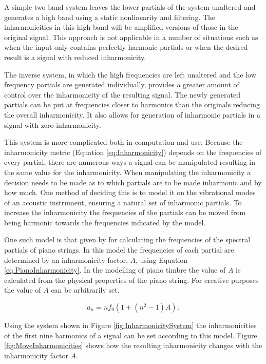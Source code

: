 			A simple two band system leaves the lower partials of the system unaltered and generates a high
			band using a static nonlinearity and filtering. The inharmonicities in this high band will be
			amplified versions of those in the original signal. This approach is not applicable in a number of
			situations such as when the input only contains perfectly harmonic partials or when the desired
			result is a signal with reduced inharmonicity.
			
			The inverse system, in which the high frequencies are left unaltered and the low frequency partials
			are generated individually, provides a greater amount of control over the inharmonicity of the
			resulting signal. The newly generated partials can be put at frequencies closer to harmonics than
			the originals reducing the overall inharmonicity. It also allows for generation of inharmonic
			partials in a signal with zero inharmonicity. 

			This system is more complicated both in computation and use. Because the inharmonicity metric
			(Equation \ref{eq:Inharmonicity}) depends on the frequencies of every partial, there are numerous
			ways a signal can be manipulated resulting in the same value for the inharmonicity. When
			manipulating the inharmonicity a decision needs to be made as to which partials are to be made
			inharmonic and by how much. One method of deciding this is to model it on the vibrational modes of
			an acoustic instrument, ensuring a natural set of inharmonic partials. To increase the
			inharmonicity the frequencies of the partials can be moved from being harmonic towards the
			frequencies indicated by the model.

			One such model is that given by \citet{rossing2002the} for calculating the frequencies of the
			spectral partials of piano strings. In this model the frequencies of each partial are determined by
			an inharmonicity factor, $A$, using Equation \ref{eq:PianoInharmonicity}. In the modelling of piano
			timbre the value of $A$ is calculated from the physical properties of the piano string. For
			creative purposes the value of $A$ can be arbitrarily set.

			\begin{equation}
				a_{n} = nf_{0} \left( 1 + \left( n^{2} - 1 \right) A \right);
				\label{eq:PianoInharmonicity}
			\end{equation}

			Using the system shown in Figure \ref{fig:InharmonicitySystem} the inharmonicities of the first
			nine harmonics of a signal can be set according to this model. Figure \ref{fig:MoveInharmonicities}
			shows how the resulting inharmonicity changes with the inharmonicity factor $A$.

